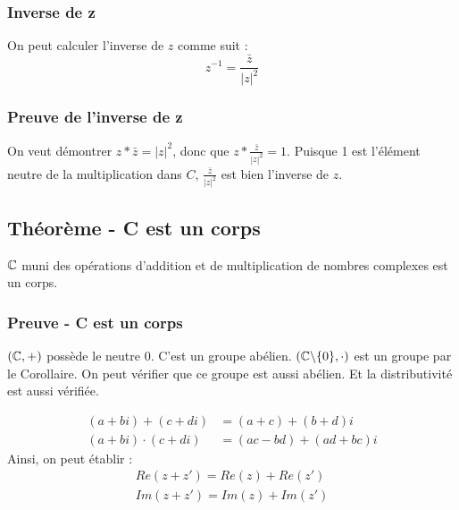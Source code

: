 \documentclass[12pt]{article}
\begin{document}
\subsubsection{Inverse de z}
On peut calculer l'inverse de $z$ comme suit :
$$
z^{-1} = \frac{\bar z}{|z|^2}
$$
\subsubsection{Preuve de l'inverse de z}
On veut démontrer $z * \bar z = |z|^2$, donc que $z*\frac{\bar z}{|z|^2}=1$.
Puisque 1 est l'élément neutre de la multiplication dans $C$, $\frac{\bar z}{|z|^2}$ est bien l'inverse de $z$.

\subsection{Théorème - C est un corps}
$\mathbb{C}$ muni des opérations d'addition et de multiplication de nombres complexes est un corps.
\subsubsection{Preuve - C est un corps}
$(\mathbb{C}, +)$ possède le neutre $0$. C'est un groupe abélien.
$(\mathbb{C} \backslash \{0\}, \cdot)$ est un groupe par le Corollaire. On peut vérifier
que ce groupe est aussi abélien. Et la distributivité est aussi vérifiée.

\[
\begin{aligned}
    (a+bi) + (c + di ) &= (a+c) + (b+d)i
     \\
     (a+bi) \cdot (c + di) &= (ac-bd) + (ad+bc)i
\end{aligned}
\]
Ainsi, on peut établir :
\[
\begin{aligned}
    Re(z + z') = Re(z) + Re(z')
     \\
    Im(z + z') = Im(z) + Im(z')
\end{aligned}
\]
\end{document}
